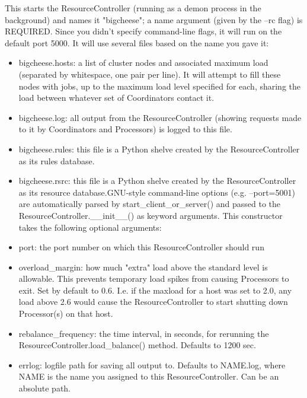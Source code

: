 \documentclass{howto}
\begin{document}
This starts the ResourceController (running as a demon process in the background) and names it "bigcheese"; a name argument (given by the --rc flag) is REQUIRED.  Since you didn't specify command-line flags, it will run on the default port 5000.  It will use several files based on the name you gave it:
\begin{itemize}
 
\item
bigcheese.hosts: a list of cluster nodes and associated maximum load (separated by whitespace, one pair per line).  It will attempt to fill these nodes with jobs, up to the maximum load level specified for each, sharing the load between whatever set of Coordinators contact it.

\item
bigcheese.log: all output from the ResourceController (showing requests made to it by Coordinators and Processors) is logged to this file.

\item
bigcheese.rules: this file is a Python shelve created by the ResourceController as its rules database.

\item
bigcheese.rsrc: this file is a Python shelve created by the ResourceController as its resource database.GNU-style command-line options (e.g. --port=5001) are automatically parsed by start_client_or_server() and passed to the ResourceController.__init__() as keyword arguments.  This constructor takes the following optional arguments:

\item
port: the port number on which this ResourceController should run

\item
overload_margin: how much "extra" load above the standard level is allowable.  This prevents temporary load spikes from causing Processors to exit.  Set by default to 0.6.  I.e. if the maxload for a host was set to 2.0, any load above 2.6 would cause the ResourceController to start shutting down Processor(s) on that host.

\item
rebalance_frequency: the time interval, in seconds, for rerunning the ResourceController.load_balance() method.  Defaults to 1200 sec.

\item
errlog: logfile path for saving all output to.  Defaults to NAME.log, where NAME is the name you assigned to this ResourceController. Can be an absolute path.

\end{itemize}
\end{document}
